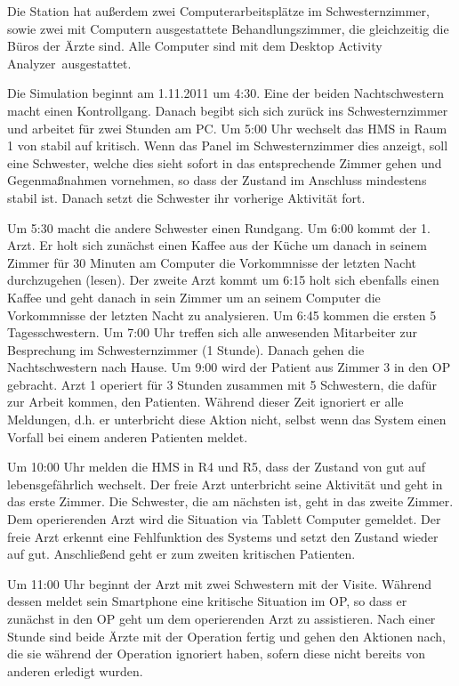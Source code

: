 Die Station hat außerdem zwei Computerarbeitsplätze im Schwesternzimmer, sowie zwei mit Computern ausgestattete Behandlungszimmer, die gleichzeitig die Büros der Ärzte sind. Alle Computer sind mit dem \glqq Desktop Activity Analyzer\grqq\ ausgestattet.

Die Simulation beginnt am 1.11.2011 um 4:30. Eine der beiden Nachtschwestern macht einen Kontrollgang. Danach begibt sich sich zurück ins Schwesternzimmer und arbeitet für zwei Stunden am PC. Um 5:00 Uhr wechselt das HMS in Raum 1 von stabil auf kritisch. Wenn das Panel im Schwesternzimmer dies anzeigt, soll eine Schwester, welche dies sieht sofort in das entsprechende Zimmer gehen und Gegenmaßnahmen vornehmen, so dass der Zustand im Anschluss mindestens stabil ist. Danach setzt die Schwester ihr vorherige Aktivität fort. 

Um 5:30 macht die andere Schwester einen Rundgang. Um 6:00 kommt der 1. Arzt. Er holt sich zunächst einen Kaffee aus der Küche um danach in seinem Zimmer für 30 Minuten am Computer die Vorkommnisse der letzten Nacht durchzugehen (lesen). Der zweite Arzt kommt um 6:15 holt sich ebenfalls einen Kaffee und geht danach in sein Zimmer um an seinem Computer die Vorkommnisse der letzten Nacht zu analysieren. Um 6:45 kommen die ersten 5 Tagesschwestern. Um 7:00 Uhr treffen sich alle anwesenden Mitarbeiter zur Besprechung im Schwesternzimmer (1 Stunde). Danach gehen die Nachtschwestern nach Hause. Um 9:00 wird der Patient aus Zimmer 3 in den OP gebracht. Arzt 1 operiert für 3 Stunden zusammen mit 5 Schwestern, die dafür zur Arbeit kommen, den Patienten. Während dieser Zeit ignoriert er alle Meldungen, d.h. er unterbricht diese Aktion nicht, selbst wenn das System einen Vorfall bei einem anderen Patienten meldet.

Um 10:00 Uhr melden die HMS in R4 und R5, dass der Zustand von gut auf lebensgefährlich wechselt. Der freie Arzt unterbricht seine Aktivität und geht in das erste Zimmer. Die Schwester, die am nächsten ist, geht in das zweite Zimmer. Dem operierenden Arzt wird die Situation via Tablett Computer gemeldet. Der freie Arzt erkennt eine Fehlfunktion des Systems und setzt den Zustand wieder auf gut. Anschließend geht er zum zweiten kritischen Patienten. 

Um 11:00 Uhr beginnt der Arzt mit zwei Schwestern mit der Visite. Während dessen meldet sein Smartphone eine kritische Situation im OP, so dass er zunächst in den OP geht um dem operierenden Arzt zu assistieren. Nach einer Stunde sind beide Ärzte mit der Operation fertig und gehen den Aktionen nach, die sie während der Operation ignoriert haben, sofern diese nicht bereits von anderen erledigt wurden.

